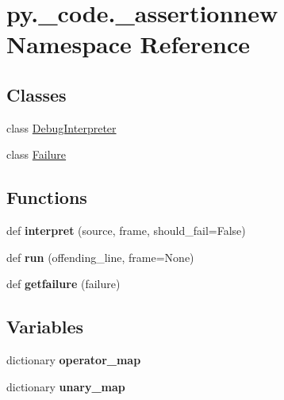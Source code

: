 \hypertarget{namespacepy_1_1__code_1_1__assertionnew}{}\section{py.\+\_\+code.\+\_\+assertionnew Namespace Reference}
\label{namespacepy_1_1__code_1_1__assertionnew}
\subsection*{Classes}
\begin{DoxyCompactItemize}
\item 
class \hyperlink{classpy_1_1__code_1_1__assertionnew_1_1_debug_interpreter}{Debug\+Interpreter}
\item 
class \hyperlink{classpy_1_1__code_1_1__assertionnew_1_1_failure}{Failure}
\end{DoxyCompactItemize}
\subsection*{Functions}
\begin{DoxyCompactItemize}
\item 
\mbox{\label{namespacepy_1_1__code_1_1__assertionnew_a9392809445ffd2b0eabef2a45e59ca65}} 
def {\bfseries interpret} (source, frame, should\+\_\+fail=False)
\item 
\mbox{\label{namespacepy_1_1__code_1_1__assertionnew_a13c71189d49371c1f4312e64e9e63cc7}} 
def {\bfseries run} (offending\+\_\+line, frame=None)
\item 
\mbox{\label{namespacepy_1_1__code_1_1__assertionnew_acec3dcd8cb5a6e1b957291c65cf2fab2}} 
def {\bfseries getfailure} (failure)
\end{DoxyCompactItemize}
\subsection*{Variables}
\begin{DoxyCompactItemize}
\item 
dictionary {\bfseries operator\+\_\+map}
\item 
dictionary {\bfseries unary\+\_\+map}
\end{DoxyCompactItemize}


